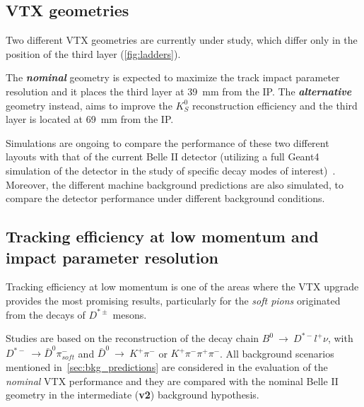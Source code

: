 \subsection{VTX geometries}

Two different VTX geometries are currently under study, which differ only in the position of the third layer (\autoref{fig:ladders}).  

The \textit{\textbf{nominal}} geometry is expected to maximize the track impact parameter resolution and it places the third layer at \SI{39}{mm} from the IP.
The \textit{\textbf{alternative}} geometry instead, aims to improve the $K_{S}^{0}$ reconstruction efficiency and the third layer is located at \SI{69}{mm} from the IP.

Simulations are ongoing to compare the performance of these two different layouts with that of the current Belle II detector (utilizing a full Geant4 simulation of the detector in the study of specific decay modes of interest)~\cite{Belle-II:2023lba}. Moreover, the different machine background predictions are also simulated, to compare the detector performance under different background conditions. 

\subsection{Tracking efficiency at low momentum and impact parameter resolution}

Tracking efficiency at low momentum is one of the areas where the VTX upgrade provides the most promising results, particularly for the \textit{soft pions} originated from the decays of $D^{*\pm}$ mesons.

Studies are based on the reconstruction of the decay chain $B^{0}~\rightarrow~D^{*-}l^{+}\nu$, with $D^{*-}~\rightarrow\bar{D}^{0} \pi^{-}_{soft}$ and $\bar{D}^{0}~\rightarrow~K^{+} \pi^{-}$ or $K^{+} \pi^{-} \pi^{+} \pi^{-}$. All background scenarios mentioned in~\autoref{sec:bkg_predictions} are considered in the evaluation of the \textit{nominal} VTX performance and they are compared with the nominal Belle II geometry in the intermediate (\textbf{v2}) background hypothesis.


